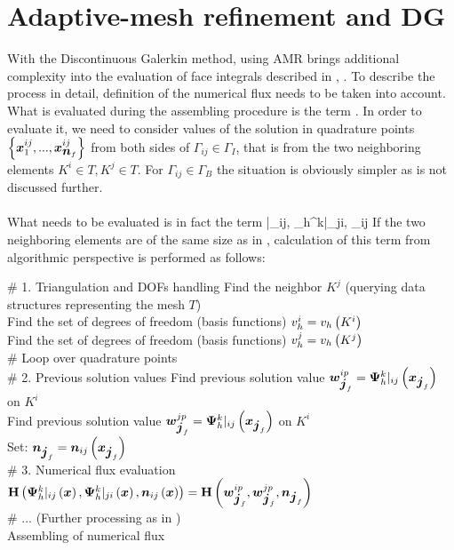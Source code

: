 \section{Adaptive-mesh refinement and DG}
With the Discontinuous Galerkin method, using AMR brings additional complexity into the evaluation of face integrals described in , .
To describe the process in detail, definition of the numerical flux  needs to be taken into account. What is evaluated during the assembling procedure  is the term . In order to evaluate it, we need to consider values of the solution in quadrature points $\left\{\mbox{\boldmath $x$}^{ij}_1, ..., \mbox{\boldmath $x$}^{ij}_{\mbox{\boldmath $n$}_f}\right\}$ from both sides of $\Gamma_{ij}\in \Gamma_I$, that is from the two neighboring elements $K^i\in T, K^j\in T$. For $\Gamma_{ij}\in \Gamma_B$ the situation is obviously simpler as is not discussed further.
\paragraph{}
What needs to be evaluated is in fact the term
\be
\mrH{}|_{ij}\lo\bfx\ro, {\mrPsi_h^{k}}|_{ji}\lo\bfx\ro, \bfn_{ij}\lo\bfx\ro\ro
\ee
If the two neighboring elements are of the same size as in , calculation of this term from algorithmic perspective is performed as follows:\\
\begin{algorithm}[H]
\# 1. Triangulation and DOFs handling
Find the neighbor $K^j$ (querying data structures representing the mesh $T$)\\
Find the set of degrees of freedom (basis functions) $v_h^i = v_h \left( K^i\right)$\\
Find the set of degrees of freedom (basis functions) $v_h^j = v_h \left( K^j\right)$\\

\# Loop over quadrature points\\
{
	\# 2. Previous solution values
	Find previous solution value $\mbox{\boldmath $w$}_{\mbox{\boldmath $j$}_f}^{ip} = {\mathrm{\mathbf{\Psi}}_h^{k}}|_{ij}\left(\mbox{\boldmath $x$}_{\mbox{\boldmath $j$}_f}\right)$ on $K^i$\\
	Find previous solution value $\mbox{\boldmath $w$}_{\mbox{\boldmath $j$}_f}^{jp} = {\mathrm{\mathbf{\Psi}}_h^{k}}|_{ij}\left(\mbox{\boldmath $x$}_{\mbox{\boldmath $j$}_f}\right)$ on $K^i$\\
	Set: $\mbox{\boldmath $n$}_{\mbox{\boldmath $j$}_f} = \mbox{\boldmath $n$}_{ij}\left(\mbox{\boldmath $x$}_{\mbox{\boldmath $j$}_f}\right)$\\
	\# 3. Numerical flux evaluation
	$\mathrm{\mathbf{H}}\left({\mathrm{\mathbf{\Psi}}_h^{k}}|_{ij}\left(\mbox{\boldmath $x$}\right), {\mathrm{\mathbf{\Psi}}_h^{k}}|_{ji}\left(\mbox{\boldmath $x$}\right), \mbox{\boldmath $n$}_{ij}\left(\mbox{\boldmath $x$}\right)\right)
		= \mathrm{\mathbf{H}}\left(\mbox{\boldmath $w$}_{\mbox{\boldmath $j$}_f}^{ip}, \mbox{\boldmath $w$}_{\mbox{\boldmath $j$}_f}^{jp}, \mbox{\boldmath $n$}_{\mbox{\boldmath $j$}_f}\right)$\\
		
	\# ... (Further processing as in )
}
\ \\
\caption{Assembling of numerical flux}
\label{algorithm:numFluxSimple}
\end{algorithm}

